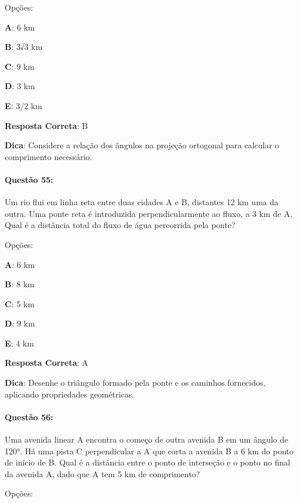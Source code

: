 \documentclass{article}
\begin{document}
\vspace{\baselineskip}Opções:

\vspace{\baselineskip}\textbf{A}: 6 km 

\textbf{B}: 3√3 km 

\textbf{C}: 9 km 

\textbf{D}: 3 km 

\textbf{E}: 3/2 km 

\vspace{\baselineskip}\textbf{Resposta Correta}: B

\vspace{\baselineskip}\textbf{Dica}: Considere a relação dos ângulos na projeção ortogonal para calcular o comprimento necessário.

\paragraph{Questão 55:}
{Um rio flui em linha reta entre duas cidades A e B, distantes 12 km uma da outra. Uma ponte reta é introduzida perpendicularmente ao fluxo, a 3 km de A. Qual é a distância total do fluxo de água percorrida pela ponte?}

\vspace{\baselineskip}Opções:

\vspace{\baselineskip}\textbf{A}: 6 km 

\textbf{B}: 8 km 

\textbf{C}: 5 km 

\textbf{D}: 9 km 

\textbf{E}: 4 km 

\vspace{\baselineskip}\textbf{Resposta Correta}: A

\vspace{\baselineskip}\textbf{Dica}: Desenhe o triângulo formado pela ponte e os caminhos fornecidos, aplicando propriedades geométricas.

\paragraph{Questão 56:}
{Uma avenida linear A encontra o começo de outra avenida B em um ângulo de 120°. Há uma pista C perpendicular a A que corta a avenida B a 6 km do ponto de início de B. Qual é a distância entre o ponto de interseção e o ponto no final da avenida A, dado que A tem 5 km de comprimento?}

\vspace{\baselineskip}Opções:
\end{document}
